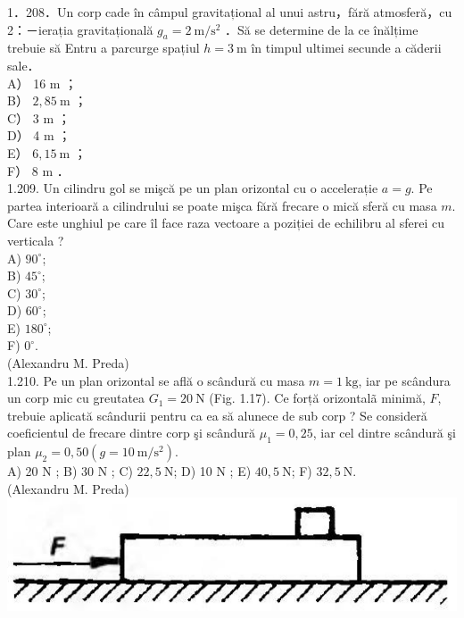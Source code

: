 \documentclass[10pt]{article}
\begin{document}
1．208．Un corp cade în câmpul gravitațional al unui astru，fără atmosferă，cu 2：－ierația gravitațională $g_{a}=2 \mathrm{~m} / \mathrm{s}^{2}$ ．Să se determine de la ce înălțime trebuie să Entru a parcurge spațiul $h=3 \mathrm{~m}$ în timpul ultimei secunde a căderii sale．\\
A） 16 m ；\\
B） $2,85 \mathrm{~m}$ ；\\
C） 3 m ；\\
D） 4 m ；\\
E） $6,15 \mathrm{~m}$ ；\\
F） 8 m ．\\
1.209. Un cilindru gol se mişcă pe un plan orizontal cu o accelerație $a=g$. Pe partea interioară a cilindrului se poate mişca fără frecare o mică sferă cu masa $m$. Care este unghiul pe care îl face raza vectoare a poziției de echilibru al sferei cu verticala ?\\
A) $90^{\circ}$;\\
B) $45^{\circ}$;\\
C) $30^{\circ}$;\\
D) $60^{\circ}$;\\
E) $180^{\circ}$;\\
F) $0^{\circ}$.\\
(Alexandru M. Preda)\\
1.210. Pe un plan orizontal se află o scândură cu masa $m=1 \mathrm{~kg}$, iar pe scândura un corp mic cu greutatea $G_{1}=20 \mathrm{~N}$ (Fig. 1.17). Ce forță orizontalã minimă, $F$, trebuie aplicată scândurii pentru ca ea să alunece de sub corp ? Se consideră coeficientul de frecare dintre corp şi scândură $\mu_{1}=0,25$, iar cel dintre scândură şi plan $\mu_{2}=0,50\left(g=10 \mathrm{~m} / \mathrm{s}^{2}\right)$.\\
A) 20 N ; B) 30 N ; C) $22,5 \mathrm{~N}$; D) 10 N ; E) $40,5 \mathrm{~N}$; F) $32,5 \mathrm{~N}$.\\
(Alexandru M. Preda)\\
\includegraphics[max width=\textwidth, center]{2025_07_01_5b3ff9fa0d508c8e9f17g-048}
\end{document}
